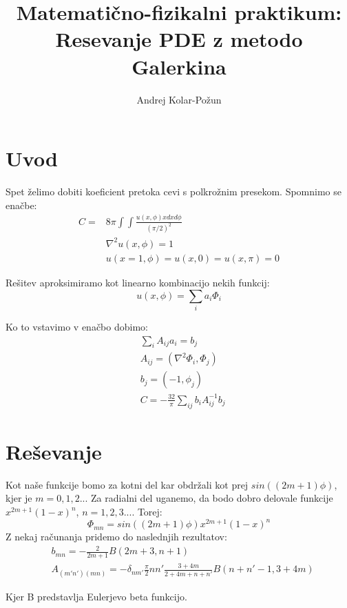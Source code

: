 \documentclass{article}
\title{Matemati{\v c}no-fizikalni praktikum: Resevanje PDE z metodo Galerkina}
\author{Andrej Kolar-Po{\v z}un}
\begin{document}
\maketitle
\newpage
{}

\section{Uvod}

Spet želimo dobiti koeficient pretoka cevi s polkrožnim presekom. Spomnimo se enačbe:
\begin{align*}
C =& 8\pi \int \int \frac{u(x,\phi) x dx d\phi }{(\pi/2)^2} \\
&\nabla ^2 u(x,\phi) = 1 \\
&u(x=1,\phi)=u(x,0) = u(x, \pi) = 0
\end{align*}

Rešitev aproksimiramo kot linearno kombinacijo nekih funkcij:
\begin{equation*}
u(x,\phi) = \sum_i a_i \Phi_i
\end{equation*}

Ko to vstavimo v enačbo dobimo:
\begin{align*}
&\sum_i A_{ij} a_i = b_j \\
&A_{ij} = (\nabla^2 \Phi_i,\Phi_j) \\
&b_j = (-1,\phi_j) \\
&C = -\frac{32}{\pi} \sum_{ij} b_i A_{ij}^{-1} b_j
\end{align*}

\newpage
\section{Reševanje}

Kot naše funkcije bomo za kotni del kar obdržali kot prej $sin((2m+1)\phi)$, kjer je $m=0,1,2..$. 
Za radialni del uganemo, da bodo dobro delovale funkcije $x^{2m+1}(1-x)^n$, $n=1,2,3...$.
Torej:
\begin{equation*}
\Phi_{mn} = sin((2m+1)\phi)x^{2m+1}(1-x)^n
\end{equation*}
Z nekaj računanja pridemo do naslednjih rezultatov:
\begin{align*}
&b_{mn} = -\frac{2}{2m+1} B(2m+3,n+1) \\ 
&A_{(m'n')(mn)} = -\delta_{nm'} \frac{\pi}{2} n n' \frac{3+4m}{2+4m+n+n'} B(n+n'-1,3+4m)
\end{align*}

Kjer B predstavlja Eulerjevo beta funkcijo.
\end{document}
